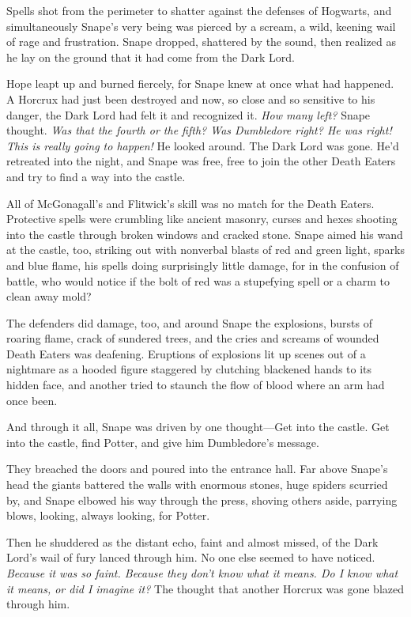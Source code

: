 Spells shot from the perimeter to shatter against the defenses of Hogwarts, and simultaneously Snape's very being was pierced by a scream, a wild, keening wail of rage and frustration. Snape dropped, shattered by the sound, then realized as he lay on the ground that it had come from the Dark Lord.

Hope leapt up and burned fiercely, for Snape knew at once what had happened. A Horcrux had just been destroyed and now, so close and so sensitive to his danger, the Dark Lord had felt it and recognized it. \emph{How many left?} Snape thought. \emph{Was that the fourth or the fifth? Was Dumbledore right? He was right! This is really going to happen!} He looked around. The Dark Lord was gone. He'd retreated into the night, and Snape was free, free to join the other Death Eaters and try to find a way into the castle.

All of McGonagall's and Flitwick's skill was no match for the Death Eaters. Protective spells were crumbling like ancient masonry, curses and hexes shooting into the castle through broken windows and cracked stone. Snape aimed his wand at the castle, too, striking out with nonverbal blasts of red and green light, sparks and blue flame, his spells doing surprisingly little damage, for in the confusion of battle, who would notice if the bolt of red was a stupefying spell or a charm to clean away mold?

The defenders did damage, too, and around Snape the explosions, bursts of roaring flame, crack of sundered trees, and the cries and screams of wounded Death Eaters was deafening. Eruptions of explosions lit up scenes out of a nightmare as a hooded figure staggered by clutching blackened hands to its hidden face, and another tried to staunch the flow of blood where an arm had once been.

And through it all, Snape was driven by one thought—Get into the castle. Get into the castle, find Potter, and give him Dumbledore's message.

They breached the doors and poured into the entrance hall. Far above Snape's head the giants battered the walls with enormous stones, huge spiders scurried by, and Snape elbowed his way through the press, shoving others aside, parrying blows, looking, always looking, for Potter.

Then he shuddered as the distant echo, faint and almost missed, of the Dark Lord's wail of fury lanced through him. No one else seemed to have noticed. \emph{Because it was so faint. Because they don't know what it means. Do I know what it means, or did I imagine it?} The thought that another Horcrux was gone blazed through him.

